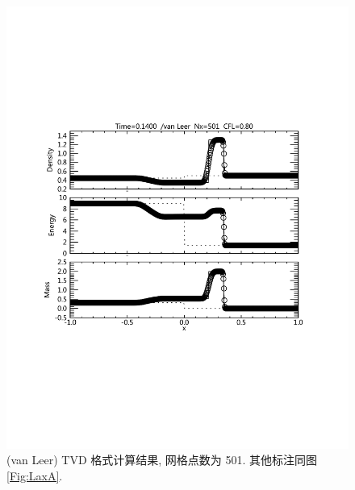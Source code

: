 \documentclass[10.5pt
]{article}
\begin{document}
\begin{figure}
\begin{center}
\includegraphics[width=.85\textwidth]{fig_tvd_2.pdf}
\caption{(van Leer) TVD 格式计算结果, 网格点数为 501. 其他标注同图\ref{Fig:LaxA}.}\label{Fig:vanLeerB}
\end{center}
\end{figure}
\end{document}

